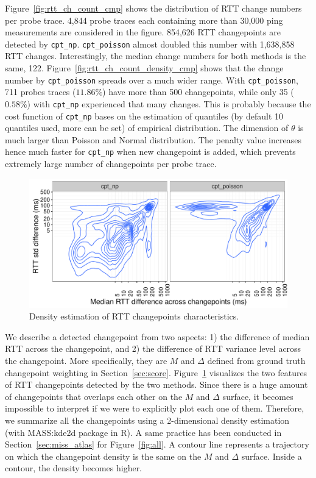 Figure~\ref{fig:rtt_ch_count_cmp} shows the distribution of RTT change numbers per probe trace. 
4,844 probe traces each containing more than 30,000 ping measurements are considered in the figure.
854,626 RTT changepoints are detected by \texttt{cpt\_np}.
\texttt{cpt\_poisson} almost doubled this number with 1,638,858 RTT changes.
Interestingly, the median change numbers for both methods is the same, 122.
Figure~\ref{fig:rtt_ch_count_density_cmp} shows that the change number by \texttt{cpt\_poisson} spreads over a much wider range.
With \texttt{cpt\_poisson}, 711 probes traces ($11.86\%$) have more than 500 changepoints, while only 35 ($0.58\%$) with \texttt{cpt\_np} experienced that many changes.
This is probably because the cost function of \texttt{cpt\_np} bases on the estimation of quantiles (by default 10 quantiles used, more can be set) of empirical distribution. The dimension of $\theta$ is much larger than Poisson and Normal distribution. The penalty value increases hence much faster for \texttt{cpt\_np} when new changepoint is added, which prevents extremely large number of changepoints per probe trace.

\begin{figure}[!thb]
\centering
\includegraphics[width=.96\textwidth]{gfx/chap4/rtt_ch_chara_cmp.pdf}
\caption{Density estimation of RTT changepoints characteristics.}
\label{fig:rtt_chara_cmp}
\end{figure}
We describe a detected changepoint from two aspects: 1) the difference of median RTT across the changepoint, and 2) the difference of RTT variance level across the changepoint.
More specifically, they are $M$ and $\Delta$ defined from ground truth changepoint weighting in Section~\ref{sec:score}.
Figure~\ref{fig:rtt_chara_cmp} visualizes the two features of RTT changepoints detected by the two methods.
Since there is a huge amount of changepoints that overlaps each other on the $M$ and $\Delta$ surface,
it becomes impossible to interpret if we were to explicitly plot each one of them.
Therefore, we summarize all the changepoints using a 2-dimensional density estimation (with MASS:kde2d package in R).
A same practice has been conducted in Section~\ref{sec:miss_atlas} for Figure~\ref{fig:all}.
A contour line represents a trajectory on which the changepoint density is the same on the $M$ and $\Delta$ surface.
Inside a contour, the density becomes higher.

